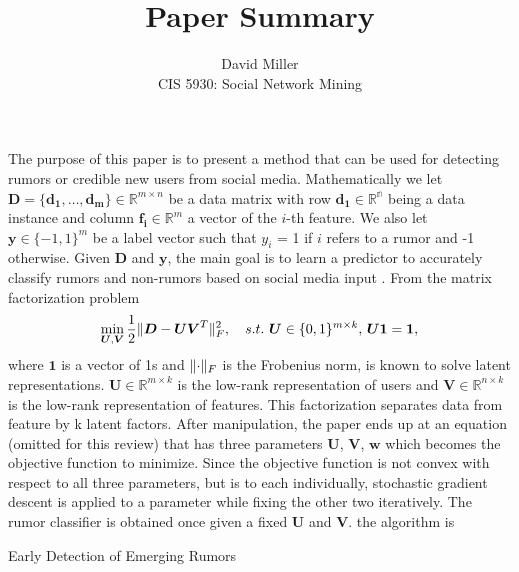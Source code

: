 \documentclass[12pt]{article}
\DeclarePairedDelimiter \norm{\lVert}{\rVert}%
\theoremstyle{remark}
\begin{document}
	
	\title{Paper Summary}
	\author{David Miller \\ 
		CIS 5930: Social Network Mining} 
	
	\maketitle 
	
	The purpose of this paper is to present a method that can be used for detecting rumors or credible new users from social media. Mathematically we let $\boldsymbol{D} = \{\boldsymbol{d_1}, \dots, \boldsymbol{d_m}\} \in \mathbb{R}^{m \times n}$ be a data matrix with row $\boldsymbol{d_1} \in \mathbb{R^n}$ being a data instance and column $\boldsymbol{f_i} \in \mathbb{R}^m$ a vector of the $i$-th feature. We also let $\boldsymbol{y} \in \{-1,1\}^m$ be a label vector such that $y_i$ = 1 if $i$ refers to a rumor and -1 otherwise. Given $\boldsymbol{D}$ and $\boldsymbol{y}$, the main goal is to learn a predictor to accurately classify rumors and non-rumors based on social media input \cite{paper}. From \cite{paper2} the matrix factorization problem
	\begin{align}
		\min\limits_{\boldsymbol{U}, \boldsymbol{V}}\frac{1}{2}\norm{\boldsymbol{D} - \boldsymbol{U}\boldsymbol{V}^T}^2_F , \quad s.t. \,\, \boldsymbol{U} \in \{0,1\}^{m \times k}, \, \boldsymbol{U1} = \boldsymbol{1} ,
	\end{align} 
	where $\boldsymbol{1}$ is a vector of 1s and $\norm{\cdot}_F$ is the Frobenius norm, is known to solve latent representations. $\boldsymbol{U} \in \mathbb{R}^{m \times k}$ is the low-rank representation of users and $\boldsymbol{V} \in \mathbb{R}^{n \times k}$ is the low-rank representation of features. This factorization separates data from feature by k latent factors. After manipulation, the paper ends up at an equation (omitted for this review) that has three parameters $\boldsymbol{U}$, $\boldsymbol{V}$, $\boldsymbol{w}$ which becomes the objective function to minimize. Since the objective function is not convex with respect to all three parameters, but is to each individually, stochastic gradient descent is applied to a parameter while fixing the other two iteratively. The rumor classifier is obtained once given a fixed $\boldsymbol{U}$ and $\boldsymbol{V}$. the algorithm is 
	\begin{algorithm}[H]
		\caption{Early Detection of Emerging Rumors}
		\begin{algorithmic}[1]
			\Indent
			  \EndIf
			\EndFor \\
			\quad \, 
			\EndIndent
		\end{algorithmic}
	\end{algorithm}
	
\end{document}
